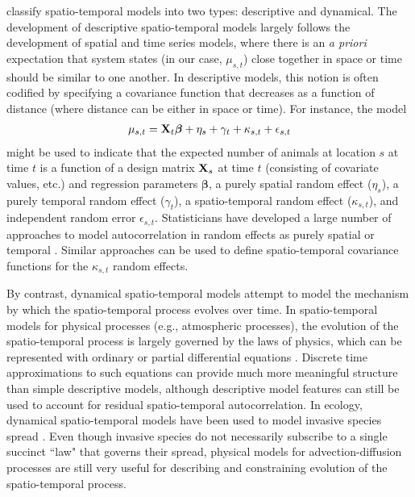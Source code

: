 \documentclass[12pt,english]{article}
\begin{document}
\begin{spacing}{1.9}
\citet{CressieWikle2011} classify spatio-temporal models into two types: descriptive and dynamical.  The development of descriptive spatio-temporal models largely follows the development of spatial and time series models, where there is an {\it a priori} expectation that system states (in our case, $\mu_{s,t}$) close together in space or time should be similar to one another.  In descriptive models, this notion is often codified by specifying a covariance function that decreases as a function of distance (where distance can be either in space or time).  For instance, the model
\begin{eqnarray}
  \mu_{s,t} = {\bf X}_t \boldsymbol{\beta} + \eta_s + \gamma_t + \kappa_{s,t} + \epsilon_{s,t} \label{eq:glmm}
\end{eqnarray}
might be used to indicate that the expected number of animals at location $s$ at time $t$ is a function of a design matrix ${\bf X}_s$ at time $t$ (consisting of covariate values, etc.) and regression parameters $\boldsymbol{\beta}$, a purely spatial random effect ($\eta_s$), a purely temporal random effect ($\gamma_t$), a spatio-temporal random effect ($\kappa_{s,t}$), and independent random error $\epsilon_{s,t}$.  Statisticians have developed a large number of approaches to model autocorrelation in random effects as purely spatial \citep[e.g., geostatistical models, Gaussian Markov random fields (GMRFs);][]{Cressie1993,BanerjeeEtAl2004,RueHeld2005} or temporal \citep[e.g., AR(p) processes and ARIMA models;][]{BoxEtAl2008,PradoWest2010}.  Similar approaches can be used to define spatio-temporal covariance functions \citep{CressieWikle2011} for the $\kappa_{s,t}$ random effects.

By contrast, dynamical spatio-temporal models attempt to model the mechanism by which the spatio-temporal process evolves over time.  In spatio-temporal models for physical processes (e.g., atmospheric processes), the evolution of the spatio-temporal process is largely governed by the laws of physics, which can be represented with ordinary or partial differential equations \citep{WikleEtAl2001,WikleHooten2010}.  Discrete time approximations to such equations can provide much more meaningful structure than simple descriptive models, although descriptive model features can still be used to account for residual spatio-temporal autocorrelation.  In ecology, dynamical spatio-temporal models have been used to model invasive species spread \citep{Wikle2003,HootenEtAl2007,HootenWikle2008}.  Even though invasive species do not necessarily subscribe to a single succinct ``law" that governs their spread, physical models for advection-diffusion processes are still very useful for describing and constraining evolution of the spatio-temporal process.


\end{spacing}
\end{document}
